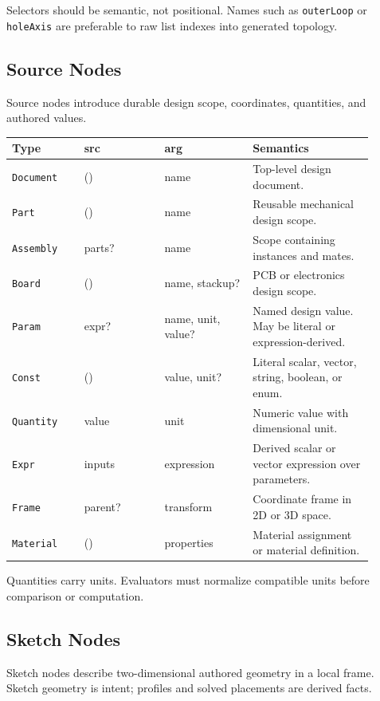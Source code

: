 \documentclass[11pt]{article}
\newcommand{\Type}[1]{\texttt{#1}}
\begin{document}
Selectors should be semantic, not positional. Names such as \Type{outerLoop} or \Type{holeAxis} are preferable to raw list indexes into generated topology.

\subsection{Source Nodes}

Source nodes introduce durable design scope, coordinates, quantities, and authored values.

\begin{center}
\small
\begin{tabular}{@{}p{0.18\linewidth}p{0.20\linewidth}p{0.22\linewidth}p{0.30\linewidth}@{}}
\hline
\textbf{Type} & \textbf{src} & \textbf{arg} & \textbf{Semantics} \\
\hline
\Type{Document} & () & name & Top-level design document. \\
\Type{Part} & () & name & Reusable mechanical design scope. \\
\Type{Assembly} & parts? & name & Scope containing instances and mates. \\
\Type{Board} & () & name, stackup? & PCB or electronics design scope. \\
\Type{Param} & expr? & name, unit, value? & Named design value. May be literal or expression-derived. \\
\Type{Const} & () & value, unit? & Literal scalar, vector, string, boolean, or enum. \\
\Type{Quantity} & value & unit & Numeric value with dimensional unit. \\
\Type{Expr} & inputs & expression & Derived scalar or vector expression over parameters. \\
\Type{Frame} & parent? & transform & Coordinate frame in 2D or 3D space. \\
\Type{Material} & () & properties & Material assignment or material definition. \\
\hline
\end{tabular}
\end{center}

Quantities carry units. Evaluators must normalize compatible units before comparison or computation.

\subsection{Sketch Nodes}

Sketch nodes describe two-dimensional authored geometry in a local frame. Sketch geometry is intent; profiles and solved placements are derived facts.
\end{document}
